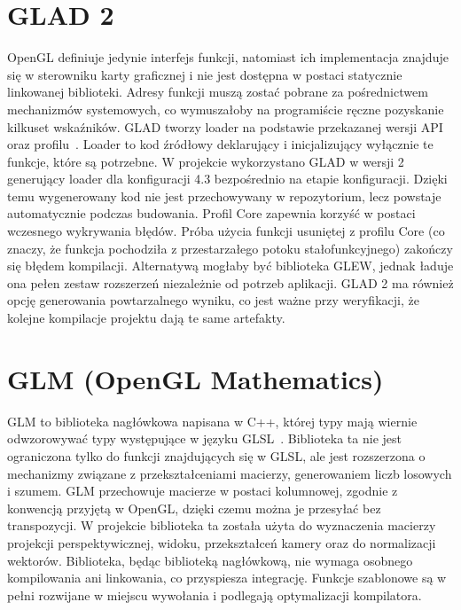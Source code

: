 \section{GLAD 2}
\label{glad}
OpenGL definiuje jedynie interfejs funkcji, natomiast ich implementacja znajduje się w sterowniku karty graficznej i nie jest dostępna w postaci statycznie linkowanej biblioteki. Adresy funkcji muszą zostać pobrane za pośrednictwem mechanizmów systemowych, co wymuszałoby na programiście ręczne pozyskanie kilkuset wskaźników. GLAD tworzy loader na podstawie przekazanej wersji API oraz profilu~\cite{glad2repo}. Loader to kod źródłowy deklarujący i inicjalizujący wyłącznie te funkcje, które są potrzebne. W projekcie wykorzystano GLAD w wersji 2 generujący loader dla konfiguracji 4.3 bezpośrednio na etapie konfiguracji. Dzięki temu wygenerowany kod nie jest przechowywany w repozytorium, lecz powstaje automatycznie podczas budowania. Profil Core zapewnia korzyść w postaci wczesnego wykrywania błędów. Próba użycia funkcji usuniętej z profilu Core (co znaczy, że funkcja pochodziła z przestarzałego potoku stałofunkcyjnego) zakończy się błędem kompilacji. Alternatywą mogłaby być biblioteka GLEW, jednak ładuje ona pełen zestaw rozszerzeń niezależnie od potrzeb aplikacji. GLAD 2 ma również opcję generowania powtarzalnego wyniku, co jest ważne przy weryfikacji, że kolejne kompilacje projektu dają te same artefakty.
\section{GLM (OpenGL Mathematics)}
\label{glm}
GLM to biblioteka nagłówkowa napisana w C++, której typy mają wiernie odwzorowywać typy występujące w języku GLSL~\cite{glmrepo}. Biblioteka ta nie jest ograniczona tylko do funkcji znajdujących się w GLSL, ale jest rozszerzona o mechanizmy związane z przekształceniami macierzy, generowaniem liczb losowych i szumem. GLM przechowuje macierze w postaci kolumnowej, zgodnie z konwencją przyjętą w OpenGL, dzięki czemu można je przesyłać bez transpozycji. W projekcie biblioteka ta została użyta do wyznaczenia macierzy projekcji perspektywicznej, widoku, przekształceń kamery oraz do normalizacji wektorów. Biblioteka, będąc biblioteką nagłówkową, nie wymaga osobnego kompilowania ani linkowania, co przyspiesza integrację. Funkcje szablonowe są w pełni rozwijane w miejscu wywołania i podlegają optymalizacji kompilatora.
